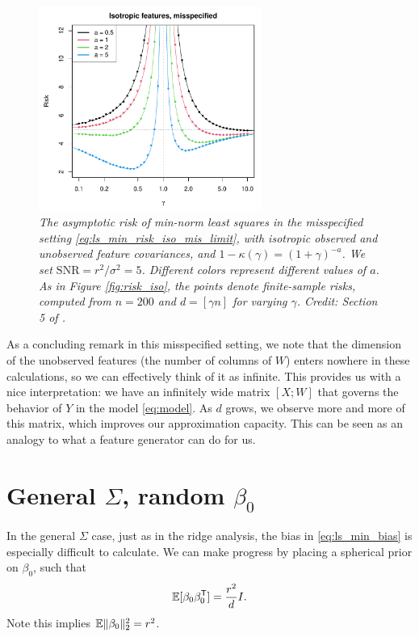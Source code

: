 \documentclass{article}
\begin{document}
\begin{figure}[htb]
\centering
\includegraphics[width=0.65\textwidth]{risk_iso_mis.pdf}
\caption{\it The asymptotic risk of min-norm least squares in the misspecified
  setting \eqref{eq:ls_min_risk_iso_mis_limit}, with isotropic observed and
  unobserved feature covariances, and $1-\kappa(\gamma) = (1+\gamma)^{-a}$. We
  set $\mathrm{SNR} = r^2 / \sigma^2 = 5$. Different colors represent different
  values of $a$. As in Figure \ref{fig:risk_iso}, the points denote
  finite-sample risks, computed from $n=200$ and $d=[\gamma n]$ for varying 
  $\gamma$. Credit: Section 5 of \citet{hastie2022surprises}.}    
\label{fig:risk_iso_mis}
\end{figure}

As a concluding remark in this misspecified setting, we note that the dimension
of the unobserved features (the number of columns of $W$) enters nowhere in
these calculations, so we can effectively think of it as infinite. This provides
us with a nice interpretation: we have an infinitely wide matrix $[X; W]$ that 
governs the behavior of $Y$ in the model \eqref{eq:model}. As $d$ grows, we
observe more and more of this matrix, which improves our approximation
capacity. This can be seen as an analogy to what a feature generator can do for
us.    

\section{General $\Sigma$, random $\beta_0$}

In the general $\Sigma$ case, just as in the ridge analysis, the bias in 
\eqref{eq:ls_min_bias} is especially difficult to calculate. We can make
progress by placing a spherical prior on $\beta_0$, such that        
\begin{equation}
\label{eq:prior}
\mathbb{E}[\beta_0 \beta_0^{\mathsf{T}}] = \frac{r^2}{d} I.
\end{equation}
Note this implies $\mathbb{E} \|\beta_0\|_2^2 = r^2$. 
\end{document}
